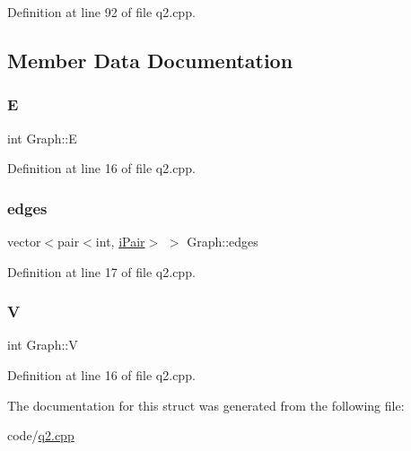 Definition at line 92 of file q2.\+cpp.



\subsection{Member Data Documentation}
\mbox{\label{struct_graph_a3ce250f958f7e96ffd9eb06780c21fbe}} 
\subsubsection{\texorpdfstring{E}{E}}
{\footnotesize\ttfamily int Graph\+::E}



Definition at line 16 of file q2.\+cpp.

\mbox{\label{struct_graph_a6392aee9a6571dd07c19f9652ffeea5a}} 
\subsubsection{\texorpdfstring{edges}{edges}}
{\footnotesize\ttfamily vector$<$pair$<$int, \hyperlink{q2_8cpp_a18fc5862b3095bd9855a9e15c67b392d}{i\+Pair}$>$ $>$ Graph\+::edges}



Definition at line 17 of file q2.\+cpp.

\mbox{\label{struct_graph_a2b722f7cfa7a21e4cb5fae488b3d4dcc}} 
\subsubsection{\texorpdfstring{V}{V}}
{\footnotesize\ttfamily int Graph\+::V}



Definition at line 16 of file q2.\+cpp.



The documentation for this struct was generated from the following file\+:\begin{DoxyCompactItemize}
\item 
code/\hyperlink{q2_8cpp}{q2.\+cpp}\end{DoxyCompactItemize}
